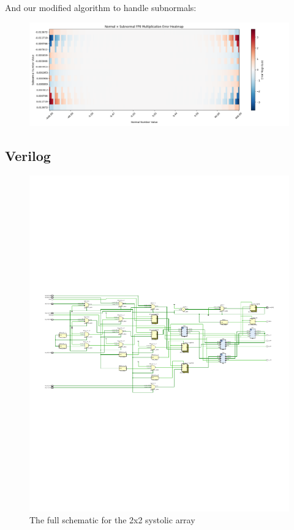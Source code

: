 \documentclass[12pt,letterpaper]{article}
\begin{document}
And our modified algorithm to handle subnormals:
\pagebreak
\begin{figure}[htbp]
    \centering
    \includegraphics[width=\linewidth]{q1_checkpoint/optimized_lmul_normalxsubnormal.png}
    \label{fig:optimized_lmul_normalxsubnormal}
\end{figure}

\subsection{Verilog}

\begin{figure}[htbp]
    \centering
    \includegraphics[clip, trim=0.5cm 9.5cm 0.5cm 9.5cm, width=1.00\textwidth]{Verilog Schematics/systolic.pdf}
    \caption{The full schematic for the 2x2 systolic array}
    \label{fig:PE}
\end{figure}
\end{document}
